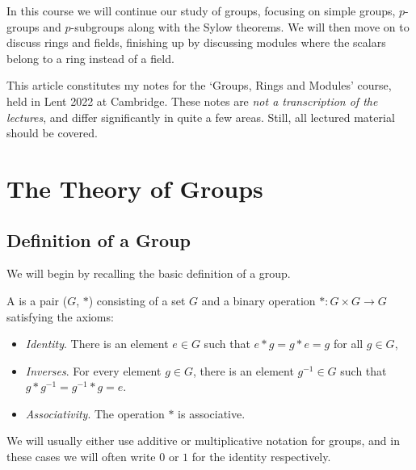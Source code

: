 




In this course we will continue our study of groups, focusing on simple groups, $p$-groups and $p$-subgroups along with the Sylow theorems. We will then move on to discuss rings and fields, finishing up by discussing modules where the scalars belong to a ring instead of a field. 

This article constitutes my notes for the `Groups, Rings and Modules' course, held in Lent 2022 at Cambridge. These notes are \emph{not a transcription of the lectures}, and differ significantly in quite a few areas. Still, all lectured material should be covered.





\section{The Theory of Groups}

\subsection{Definition of a Group}

We will begin by recalling the basic definition of a group.


\begin{definition}[Group]
	A  is a pair ($G$, $*$) consisting of a set $G$ and a binary operation $* : G \times G \rightarrow G$ satisfying the axioms:
	\begin{itemize}
		\item \emph{Identity}. There is an element $e \in G$ such that $e * g = g * e = g$ for all $g \in G$,
		\item \emph{Inverses}. For every element $g \in G$, there is an element $g^{-1} \in G$ such that $g * g^{-1} = g^{-1} * g = e$.
		\item \emph{Associativity}. The operation $*$ is associative.
	\end{itemize}
\end{definition}


\begin{remark}
	We will usually either use additive or multiplicative notation for groups, and in these cases we will often write $0$ or $1$ for the identity respectively.
\end{remark}

